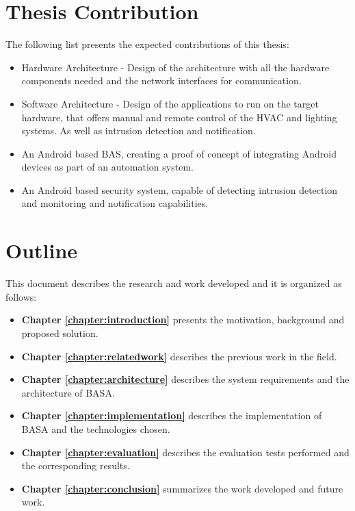 \section{Thesis Contribution}
\label{section:contribution}

The following list presents the expected contributions of this thesis:

\begin{itemize}
    \item Hardware Architecture - Design of the architecture with all the hardware components needed and the network interfaces for communication.
    \item Software Architecture - Design of the applications to run on the target hardware, that offers manual and remote control of the \ac{HVAC} and lighting systems. As well as intrusion detection and notification.
    \item An Android based BAS, creating a proof of concept of integrating Android devices as part of an automation system.
    \item An Android based security system, capable of detecting intrusion detection and monitoring and notification capabilities.
    
\end{itemize}

\section{Outline}
This document describes the research and work developed and it is organized as follows:

\begin{itemize}
\item \textbf{Chapter \ref{chapter:introduction}} presents the motivation, background and proposed solution.
\item \textbf{Chapter \ref{chapter:relatedwork}} describes the previous work in the field.
\item \textbf{Chapter \ref{chapter:architecture}} describes the system requirements and the architecture of BASA.
\item \textbf{Chapter \ref{chapter:implementation}} describes the implementation of BASA and the technologies chosen.
\item \textbf{Chapter \ref{chapter:evaluation}} describes the evaluation tests performed and the corresponding results.
\item \textbf{Chapter \ref{chapter:conclusion}} summarizes the work developed and future work.
\end{itemize}

\cleardoublepage
